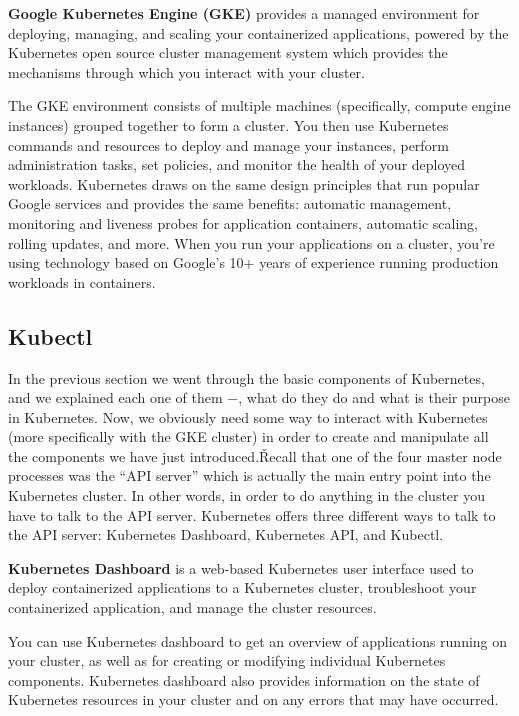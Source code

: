 \textbf{Google Kubernetes Engine (GKE)} provides a managed environment for deploying, managing, and scaling your
containerized applications, powered by the Kubernetes open source cluster management system which provides the
mechanisms through which you interact with your cluster.
\ed

The GKE environment consists of multiple machines (specifically, compute engine instances) grouped together to form a
cluster. You then use Kubernetes commands and resources to deploy and manage your instances, perform administration
tasks, set policies, and monitor the health of your deployed workloads. Kubernetes draws on the same design
principles that run popular Google services and provides the same benefits: automatic management, monitoring and
liveness probes for application containers, automatic scaling, rolling updates, and more. When you run your
applications on a cluster, you're using technology based on Google's 10+ years of experience running production
workloads in containers.

\subsection{Kubectl}

In the previous section we went through the basic components of Kubernetes, and we explained each one of them $-$,
what do they do and what is their purpose in Kubernetes. Now, we obviously need some way to interact with Kubernetes
(more specifically with the GKE cluster) in order to create and manipulate all the components we have just introduced.\v

Recall that one of the four master node processes was the ``API server'' which is actually the main entry point into
the Kubernetes cluster. In other words, in order to do anything in the cluster you have to talk to the API server.
Kubernetes offers three different ways to talk to the API server: Kubernetes Dashboard, Kubernetes API, and Kubectl.

\textbf{Kubernetes Dashboard} is a web-based Kubernetes user interface used to deploy containerized applications to a
Kubernetes cluster, troubleshoot your containerized application, and manage the cluster resources.
\ed

You can use Kubernetes dashboard to get an overview of applications running on your cluster, as well as for creating
or modifying individual Kubernetes components. Kubernetes dashboard also provides information on the state of
Kubernetes resources in your cluster and on any errors that may have occurred.

